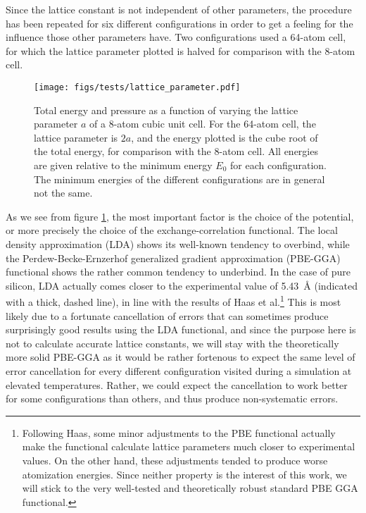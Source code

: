 \documentclass[11pt,bibliography=totoc,index=totoc]{scrbook}   %
\begin{document}
Since the lattice constant is not independent of other parameters, the procedure has been repeated for six different configurations in order to get a feeling for the influence those other parameters have. 
Two configurations used a 64-atom cell, for which the lattice parameter plotted is halved for comparison with the 8-atom cell.

\begin{figure}[htbp]
  \begin{center}
    \texttt{[image: figs/tests/lattice\_parameter.pdf]}
  \end{center}
  \caption{
     Total energy and pressure as a function of varying the lattice parameter $a$ of a 8-atom cubic unit cell.
     For the 64-atom cell, the lattice parameter is $2a$, and the energy plotted is the cube root of the total energy, 
     for comparison with the 8-atom cell. 
     All energies are given relative to the minimum energy $E_0$ for each configuration.
     The minimum energies of the different configurations are in general not the same.
  }
  \label{fig:si_bulk_conv_vol}
\end{figure}

As we see from figure \ref{fig:si_bulk_conv_vol}, the most important factor is the choice of the potential, or more precisely the choice of the exchange-correlation functional.
The local density approximation (LDA) shows its well-known tendency to overbind, while the Perdew-Becke-Ernzerhof generalized gradient approximation (PBE-GGA) 
functional shows the rather common tendency to underbind. 
In the case of pure silicon, LDA actually comes closer to the experimental value of 5.43~Å (indicated with a thick, dashed line), in line with the results of Haas et al.\cite{Haas:2010}\footnote{Following Haas, some minor adjustments to the PBE functional actually make the functional calculate lattice parameters much closer to experimental values.
On the other hand, these adjustments tended to produce worse atomization energies. Since neither property is the interest of this work, we will stick to the very well-tested and theoretically robust standard PBE GGA functional.}
This is most likely due to a fortunate cancellation of errors that can sometimes produce surprisingly good results using the LDA functional,\cite[see e.g.][167]{Martin:2004} and since the purpose here is not to calculate accurate lattice constants, we will stay with the theoretically more solid PBE-GGA as it would be rather fortenous to expect the same level of error cancellation for every different configuration visited during a simulation at elevated temperatures. 
Rather, we could expect the cancellation to work better for some configurations than others, and thus produce non-systematic errors.
\end{document}
